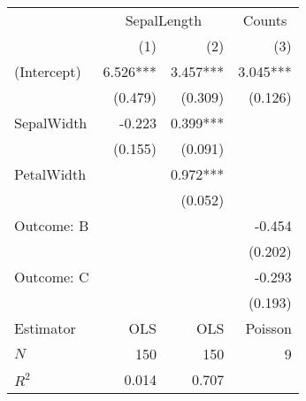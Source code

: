 \begin{tabular}{lrrr}
\toprule
            & \multicolumn{2}{c}{SepalLength} & \multicolumn{1}{c}{Counts} \\ 
\cmidrule(lr){2-3} \cmidrule(lr){4-4} 
            &            (1) &            (2) &                        (3) \\ 
\midrule
(Intercept) &       6.526*** &       3.457*** &                   3.045*** \\ 
            &        (0.479) &        (0.309) &                    (0.126) \\ 
SepalWidth  &         -0.223 &       0.399*** &                            \\ 
            &        (0.155) &        (0.091) &                            \\ 
PetalWidth  &                &       0.972*** &                            \\ 
            &                &        (0.052) &                            \\ 
Outcome: B  &                &                &                     -0.454 \\ 
            &                &                &                    (0.202) \\ 
Outcome: C  &                &                &                     -0.293 \\ 
            &                &                &                    (0.193) \\ 
\midrule
Estimator   &            OLS &            OLS &                    Poisson \\ 
\midrule
$N$         &            150 &            150 &                          9 \\ 
$R^2$       &          0.014 &          0.707 &                            \\ 
\bottomrule
\end{tabular}
